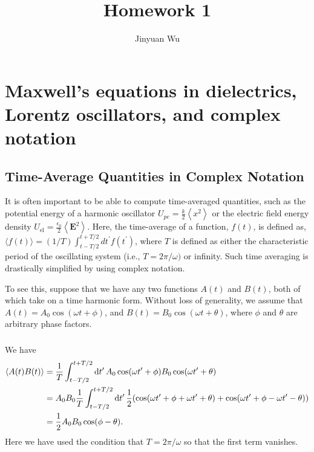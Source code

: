 \documentclass[hyperref, a4paper]{article}
\title{Homework 1}
\author{Jinyuan Wu}
\begin{document}
\maketitle

\section{Maxwell's equations in dielectrics, Lorentz oscillators, and complex notation}

\subsection{Time-Average Quantities in Complex Notation}

It is often important to be able to compute time-averaged quantities, such as the potential energy of a harmonic oscillator $U_{p e}=\frac{k}{2}\left\langle x^2\right\rangle$ or the electric field energy density $U_{\mathrm{el}}=\frac{\epsilon_0}{2}\left\langle\mathbf{E}^2\right\rangle$. Here, the time-average of a function, $f(t)$, is defined as, $\langle f(t)\rangle=(1 / T) \int_{t-T / 2}^{t+T / 2} d t^{\prime} f\left(t^{\prime}\right)$, where $T$ is defined as either the characteristic period of the oscillating system (i.e., $T=2 \pi / \omega)$ or infinity. Such time averaging is drastically simplified by using complex notation.

To see this, suppose that we have any two functions $A(t)$ and $B(t)$, both of which take on a time harmonic form. Without loss of generality, we assume that $A(t)=A_0 \cos (\omega t+\phi)$, and $B(t)=B_0 \cos (\omega t+\theta)$, where $\phi$ and $\theta$ are arbitrary phase factors.

\subsubsection{}

We have 
\begin{equation}
    \begin{aligned}
        \expval{A(t) B(t)} &= 
        \frac{1}{T} \int_{t - T/2}^{t + T/2} \dd{t'} 
            A_0 \cos(\omega t' + \phi) 
            B_0 \cos (\omega t' + \theta) \\
        &= A_0 B_0 \frac{1}{T} \int_{t - T/2}^{t + T/2} \dd{t'} 
            \frac{1}{2} (
                \cos(\omega t' + \phi + \omega t' + \theta) 
                + \cos (\omega t' + \phi - \omega t' - \theta)
            ) \\
        &= \frac{1}{2} A_0 B_0 \cos (\phi - \theta).
    \end{aligned}
\end{equation}
Here we have used the condition that $T = 2 \pi / \omega$ 
so that the first term vanishes.
\end{document}
